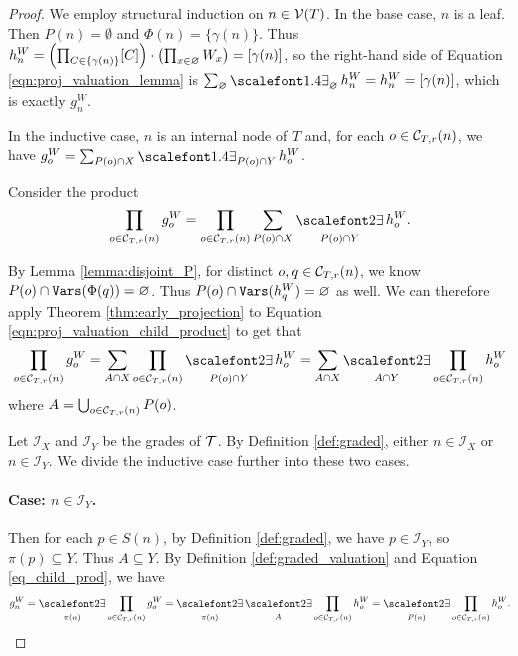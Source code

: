 \begin{proof}
We employ structural induction on $n \in \mathcal{V}(T)$.
In the base case, $n$ is a leaf. Then $P(n) = \emptyset$ and $\Phi(n) = \{ \gamma(n) \}$. Thus $h^W_n = \left( \prod_{C \in \{ \gamma(n) \} } [C] \right) \cdot \left( \prod_{x \in \varnothing} W_x \right) = [\gamma(n)]$, so the right-hand side of Equation \eqref{eqn:proj_valuation_lemma} is
$\sum_\emptyset \exist_\emptyset h^W_n = h^W_n = [\gamma(n)]$, which is exactly $g^W_n$.

In the inductive case, $n$ is an internal node of $T$ and, for each $o \in \mathcal{C}_{T,r}(n)$, we have
$g^W_o = \sum_{P(o) \cap X} \exist_{P(o) \cap Y} h^W_o$.

Consider the product
\begin{equation}
\label{eqn:proj_valuation_child_product}
    \prod_{o \in \C T r n} g^W_o = \prod_{o \in \C T r n} \sum_{P(o) \cap X} \displaystyle\exist_{P(o) \cap Y} h^W_o.
\end{equation}

By Lemma \ref{lemma:disjoint_P}, for distinct $o, q \in \mathcal{C}_{T,r}(n)$, we know $P(o) \cap \texttt{\upshape Vars}(\Phi(q)) = \varnothing$. Thus $P(o) \cap \texttt{\upshape Vars}(h^W_q) = \varnothing$ as well. We can therefore apply Theorem \ref{thm:early_projection} to Equation \eqref{eqn:proj_valuation_child_product} to get that
\begin{equation}
\prod_{o \in \C{T}{r}{n}} g^W_o = \sum_{A \cap X} \prod_{o \in \C{T}{r}{n}} \displaystyle\exist_{P(o) \cap Y} h^W_o = \sum_{A \cap X} \displaystyle\exist_{A \cap Y} \prod_{o \in \C{T}{r}{n}} h^W_o \label{eq_child_prod}
\end{equation}
where $A = \bigcup_{o \in \mathcal{C}_{T,r}(n)} P(o)$.

Let $\mathcal{I}_X$ and $\mathcal{I}_Y$ be the grades of $\mathcal{T}$. By Definition \ref{def:graded}, either $n \in \mathcal{I}_X$ or $n \in \mathcal{I}_Y$. We divide the inductive case further into these two cases.

\paragraph{Case: $n \in \mathcal{I}_Y$.} Then for each $p \in S(n)$, by Definition \ref{def:graded}, we have $p \in \mathcal{I}_Y$, so $\pi(p) \subseteq Y$. Thus $A \subseteq Y$. 
By Definition \ref{def:graded_valuation} and Equation \eqref{eq_child_prod}, we have
\begin{equation*}
    g^W_n = \displaystyle\exist_{\pi(n)} \prod_{o \in \C{T}{r}{n}} g^W_o = \displaystyle\exist_{\pi(n)} \displaystyle\exist_{A} \prod_{o \in \C{T}{r}{n}} h^W_o = \displaystyle\exist_{P(n)} \prod_{o \in \C{T}{r}{n}} h^W_o.
\end{equation*}


\end{proof}
